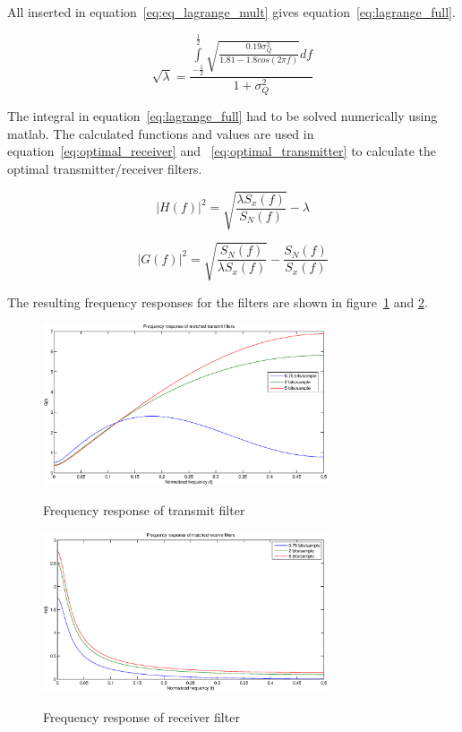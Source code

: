 	All inserted in equation~\ref{eq:eq_lagrange_mult} gives equation~\ref{eq:lagrange_full}.

	\begin{equation}
		\sqrt{\lambda}=\frac{\int\limits_{-\frac{1}{2}}^{\frac{1}{2}}\sqrt{\frac{0.19\sigma^2_Q}{1.81-1.8cos(2\pi f)}}df}{1+\sigma^2_Q}
		\label{eq:lagrange_full}
	\end{equation}
	
	The integral in equation~\ref{eq:lagrange_full} had to be solved numerically using matlab. The calculated functions and values are used in equation~\ref{eq:optimal_receiver} and ~\ref{eq:optimal_transmitter} to calculate the optimal transmitter/receiver filters.
	
	\begin{equation}
		|H(f)|^2=\sqrt{\frac{\lambda S_x(f)}{S_N(f)}}-\lambda
		\label{eq:optimal_receiver}
	\end{equation}
	
	\begin{equation}
		|G(f)|^2=\sqrt{\frac{S_N(f)}{\lambda S_x(f)}}-\frac{S_N(f)}{S_x(f)}
		\label{eq:optimal_transmitter}
	\end{equation}
	
	The resulting frequency responses for the filters are shown in figure~\ref{fig:freq_opt_G} and \ref{fig:freq_opt_H}.
	
	\begin{figure}[H]
	  \centering
	  \includegraphics[width=0.75\textwidth]{img/Oppgave2a_freq_G}
	  \label{fig:freq_opt_G}
	  \caption{Frequency response of transmit filter}
	\end{figure}
	
	\begin{figure}[H]
	  \centering
	  \includegraphics[width=0.75\textwidth]{img/Oppgave2a_freq_H}
	  \label{fig:freq_opt_H}
	  \caption{Frequency response of receiver filter}
	\end{figure}
	
